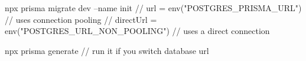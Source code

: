 npx prisma migrate dev --name init
// url       = env("POSTGRES_PRISMA_URL") // uses connection pooling
// directUrl = env("POSTGRES_URL_NON_POOLING") // uses a direct connection

npx prisma generate // run it if you switch database url

